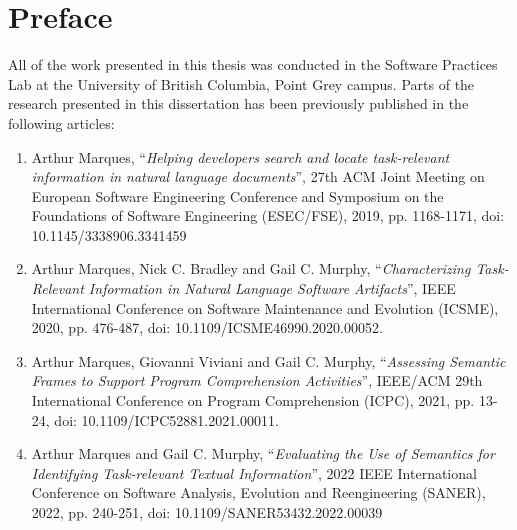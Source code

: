 
\chapter{Preface}

All of the work presented in this thesis was conducted in the Software Practices
Lab at the University of British Columbia, Point Grey campus.
Parts of the research presented in this dissertation has been previously published in the following articles:


\begin{enumerate}
    \item  Arthur Marques, ``\textit{Helping developers search and locate task-relevant information in natural language documents}'', 27th ACM Joint Meeting on European Software Engineering Conference and Symposium on the Foundations of Software Engineering (ESEC/FSE), 2019, pp. 1168-1171, doi: 10.1145/3338906.3341459
    \item  Arthur Marques, Nick C. Bradley and Gail C. Murphy, ``\textit{Characterizing Task-Relevant Information in Natural Language Software Artifacts}'', IEEE International Conference on Software Maintenance and Evolution (ICSME), 2020, pp. 476-487, doi: 10.1109/ICSME46990.2020.00052.
    \item  Arthur Marques, Giovanni Viviani and Gail C. Murphy, ``\textit{Assessing Semantic Frames to Support Program Comprehension Activities}'',  IEEE/ACM 29th International Conference on Program Comprehension (ICPC), 2021, pp. 13-24, doi: 10.1109/ICPC52881.2021.00011.
    \item   Arthur Marques and Gail C. Murphy, ``\textit{Evaluating the Use of Semantics for Identifying Task-relevant Textual Information}'',  2022 IEEE International Conference on Software Analysis, Evolution and Reengineering (SANER), 2022, pp. 240-251, doi: 10.1109/SANER53432.2022.00039
\end{enumerate}




